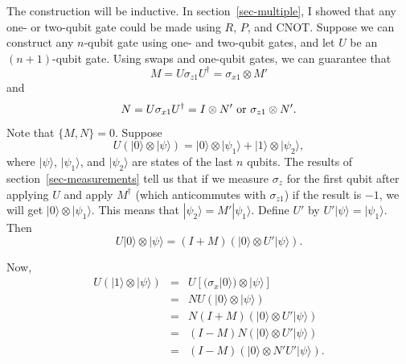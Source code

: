 \documentclass{report}
\newcommand{\ket}[1]{|{#1}\rangle}
\newcommand{\X}{\sigma_x}
\newcommand{\Z}{\sigma_z}
\newcommand{\Xs}[1]{\sigma_{x{#1}}}
\newcommand{\Zs}[1]{\sigma_{z{#1}}}
\begin{document}
The construction will be inductive.  In section~\ref{sec-multiple}, I showed 
that any one- or two-qubit gate could be made using $R$, $P$, and CNOT.  
Suppose we can construct any $n$-qubit gate using one- and two-qubit 
gates, and let $U$ be an $(n+1)$-qubit gate.  Using swaps and one-qubit 
gates, we can guarantee that
\begin{equation}
M = U \Zs{1} U^\dagger = \Xs{1} \otimes M'
\end{equation}
and
\begin{equation}
N = U \Xs{1} U^\dagger = I \otimes N'\ {\rm or}\ \Zs{1} \otimes N'.
\end{equation}
Note that $\{M, N\} = 0$.  Suppose
\begin{equation}
U (\ket{0} \otimes \ket{\psi}) = \ket{0} \otimes \ket{\psi_1} + \ket{1} 
\otimes \ket{\psi_2},
\end{equation}
where $\ket{\psi}$, $\ket{\psi_1}$, and $\ket{\psi_2}$ are states of the 
last $n$ qubits.  The results of section~\ref{sec-measurements} tell us that 
if we measure $\Z$ for the first qubit after applying $U$ and apply 
$M^\dagger$ (which anticommutes with $\Zs{1}$) if the result is $-1$, we 
will get $\ket{0} \otimes \ket{\psi_1}$.  This means that $\ket{\psi_2} = 
M' \ket{\psi_1}$.  Define $U'$ by $U' \ket{\psi} = \ket{\psi_1}$.  Then
\begin{equation}
U \ket{0} \otimes \ket{\psi} = (I + M) (\ket{0} \otimes U' \ket{\psi}).
\end{equation}

Now,
\begin{eqnarray}
U (\ket{1} \otimes \ket{\psi}) & = & U \left[ (\X \ket{0}) \otimes 
\ket{\psi} \right] \\
& = & N U (\ket{0} \otimes \ket{\psi}) \\
& = & N (I + M) (\ket{0} \otimes U' \ket{\psi}) \\
& = & (I - M) N (\ket{0} \otimes U' \ket{\psi}) \\
& = & (I- M) (\ket{0} \otimes N' U' \ket{\psi}).
\end{eqnarray}
\end{document}
